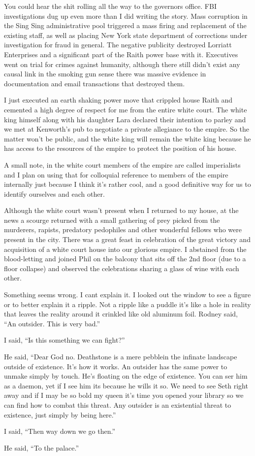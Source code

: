 You could hear the shit rolling all the way to the governors office. FBI investigations dug up even more than I did writing the story. Mass corruption in the Sing Sing administrative pool triggered a mass firing and replacement of the existing staff, as well as placing New York state department of corrections under investigation for fraud in general. The negative publicity destroyed Lorriatt Enterprises and a significant part of the Raith power base with it. Executives went on trial for crimes against humanity, although there still didn't exist any causal link in the smoking gun sense there was massive evidence in documentation and email transactions that destroyed them.

I just executed an earth shaking power move that crippled house Raith and cemented a high degree of respect for me from the entire white court. The white king himself along with his daughter Lara declared their intention to parley and we met at Kenworth's pub to negotiate a private allegiance to the empire. So the matter won't be public, and the white king will remain the white king because he has access to the resources of the empire to protect the position of his house.

A small note, in the white court members of the empire are called imperialists and I plan on using that for colloquial reference to members of the empire internally just because I think it's rather cool, and a good definitive way for us to identify ourselves and each other.

Although the white court wasn't present when I returned to my house, at the news a scourge returned with a small gathering of prey picked from the murderers, rapists, predatory pedophiles and other wonderful fellows who were present in the city. There was a great feast in celebration of the great victory and acquisition of a white court house into our glorious empire. I abstained from the blood-letting and joined Phil on the balcony that sits off the 2nd floor (due to a floor collapse) and observed the celebrations sharing a glass of wine with each other.

Something seems wrong. I cant explain it. I looked out the window to see a figure or to better explain it a ripple. Not a ripple like a puddle it's like a hole in reality that leaves the reality around it crinkled like old aluminum foil.  Rodney said, ``An outsider. This is very bad.''

I said, ``Is this something we can fight?''

He said, ``Dear God no. Deathstone is a mere pebblein the infinate landscape outside of existence. It's how it works. An outsider has the same power to unmake simply by touch. He's floating on the edge of existence. You can ser him as a daemon, yet if I see him its because he wills it so. We need to see Seth right away and if I may be so bold my queen it's time you opened your library so we can find how to combat this threat. Any outsider is an existential threat to existence, just simply by being here.''

I said, ``Then way down we go then.''

He said, ``To the palace.''









 